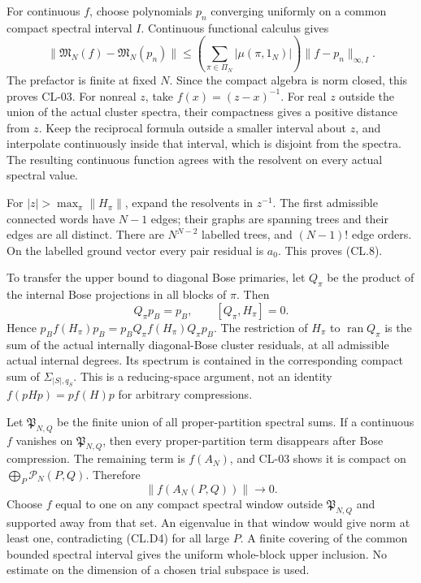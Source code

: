 \documentclass[a4paper,11pt]{article}
\numberwithin{equation}{section}
\begin{document}
For continuous \(f\), choose polynomials \(p_n\) converging uniformly on a common compact spectral interval \(I\). Continuous functional calculus gives \[
\|\mathfrak M_N(f)-\mathfrak M_N(p_n)\|
\leq\left(\sum_{\pi\in\Pi_N}|\mu(\pi,1_N)|\right)
\|f-p_n\|_{\infty,I}.
\tag{CL.D2}
\] The prefactor is finite at fixed \(N\). Since the compact algebra is norm closed, this proves CL-03. For nonreal \(z\), take \(f(x)=(z-x)^{-1}\). For real \(z\) outside the union of the actual cluster spectra, their compactness gives a positive distance from \(z\). Keep the reciprocal formula outside a smaller interval about \(z\), and interpolate continuously inside that interval, which is disjoint from the spectra. The resulting continuous function agrees with the resolvent on every actual spectral value.

For \(|z|>\max_\pi\|H_\pi\|\), expand the resolvents in \(z^{-1}\). The first admissible connected words have \(N-1\) edges; their graphs are spanning trees and their edges are all distinct. There are \(N^{N-2}\) labelled trees, and \((N-1)!\) edge orders. On the labelled ground vector every pair residual is \(a_0\). This proves (CL.8).

To transfer the upper bound to diagonal Bose primaries, let \(Q_\pi\) be the product of the internal Bose projections in all blocks of \(\pi\). Then \[
Q_\pi p_B=p_B,\qquad [Q_\pi,H_\pi]=0.
\tag{CL.D3}
\] Hence \(p_Bf(H_\pi)p_B=p_BQ_\pi f(H_\pi)Q_\pi p_B\). The restriction of \(H_\pi\) to \(\operatorname{ran}Q_\pi\) is the sum of the actual internally diagonal-Bose cluster residuals, at all admissible actual internal degrees. Its spectrum is contained in the corresponding compact sum of \(\Sigma_{|S|,q_S}\). This is a reducing-space argument, not an identity \(f(pHp)=pf(H)p\) for arbitrary compressions.

Let \(\mathfrak P_{N,Q}\) be the finite union of all proper-partition spectral sums. If a continuous \(f\) vanishes on \(\mathfrak P_{N,Q}\), then every proper-partition term disappears after Bose compression. The remaining term is \(f(A_N)\), and CL-03 shows it is compact on \(\bigoplus_P\mathcal P_N(P,Q)\). Therefore \[
\|f(A_N(P,Q))\|\longrightarrow0.
\tag{CL.D4}
\] Choose \(f\) equal to one on any compact spectral window outside \(\mathfrak P_{N,Q}\) and supported away from that set. An eigenvalue in that window would give norm at least one, contradicting (CL.D4) for all large \(P\). A finite covering of the common bounded spectral interval gives the uniform whole-block upper inclusion. No estimate on the dimension of a chosen trial subspace is used.
\end{document}
